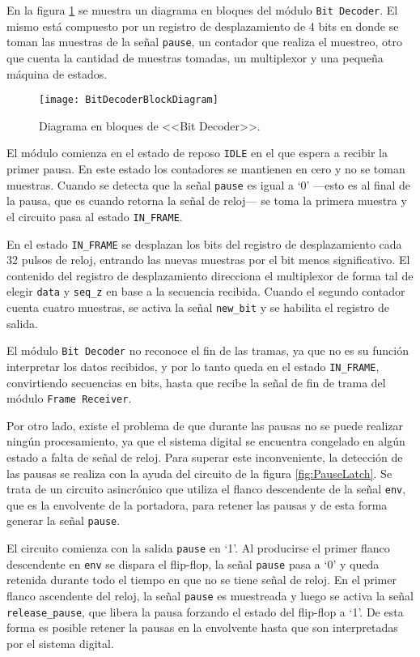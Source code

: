 En la figura \ref{fig:BitDecoderBlockDiagram} se muestra un diagrama 
en bloques del módulo \lstinline{Bit Decoder}. El mismo está 
compuesto por un registro de desplazamiento de 4 bits en donde se toman
las muestras de la señal \lstinline{pause}, un contador que realiza el 
muestreo, otro que cuenta la cantidad de muestras tomadas, un 
multiplexor y una pequeña máquina de estados.

\begin{figure}
	\centering
	\texttt{[image: BitDecoderBlockDiagram]}
	\caption{Diagrama en bloques de <<Bit Decoder>>.}
	\label{fig:BitDecoderBlockDiagram}
\end{figure}

El módulo comienza en el estado de reposo \lstinline{IDLE} en el que 
espera a recibir la primer pausa. En este estado los contadores se 
mantienen en cero y no se toman muestras. Cuando se detecta que la señal 
\lstinline{pause} es igual a `0' ---esto es al final de la pausa, que 
es cuando retorna la señal de reloj--- se toma la primera muestra y el 
circuito pasa al estado \lstinline{IN_FRAME}.

En el estado \lstinline{IN_FRAME} se desplazan los bits del registro 
de desplazamiento cada 32 pulsos de reloj, entrando las nuevas 
muestras por el bit menos significativo. El contenido del registro de 
desplazamiento direcciona el multiplexor de forma tal de elegir 
\lstinline{data} y \lstinline{seq_z} en base a la secuencia recibida. 
Cuando el segundo contador cuenta cuatro muestras, se activa la señal 
\lstinline{new_bit} y se habilita el registro de salida.

El módulo \lstinline{Bit Decoder} no reconoce el fin de las tramas, 
ya que no es su función interpretar los datos recibidos, y por lo 
tanto queda en el estado \lstinline{IN_FRAME}, convirtiendo 
secuencias en bits, hasta que recibe la señal de fin de trama del 
módulo \lstinline{Frame Receiver}.

Por otro lado, existe el problema de que durante las pausas no se puede 
realizar ningún procesamiento, ya que el sistema digital se 
encuentra congelado en algún estado a falta de señal de reloj. Para 
superar este inconveniente, la detección de las pausas se realiza con 
la ayuda del circuito de la figura \ref{fig:PauseLatch}. Se trata de 
un circuito asincrónico que utiliza el flanco descendente de la señal 
\lstinline{env}, que es la envolvente de la portadora, para retener las
pausas y de esta forma generar la señal \lstinline{pause}. 

El circuito comienza con la salida \lstinline{pause} en `1'. Al 
producirse el primer flanco descendente en \lstinline{env} se 
dispara el flip-flop, la señal \lstinline{pause} pasa a `0' y queda 
retenida durante todo el tiempo en que no se tiene señal de reloj. En el 
primer flanco ascendente del reloj, la señal \lstinline{pause} es 
muestreada y luego se activa la señal \lstinline{release_pause}, que
libera la pausa forzando el estado del flip-flop a `1'. De esta forma 
es posible retener la pausas en la envolvente hasta que son 
interpretadas por el sistema digital.

